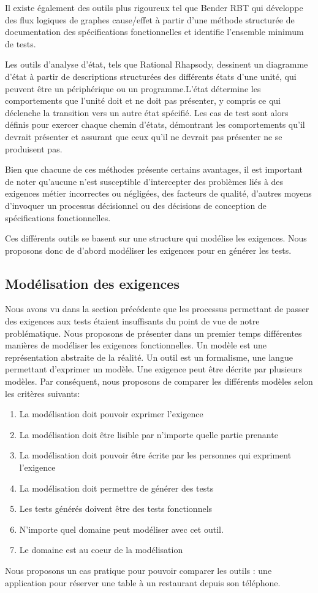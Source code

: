         Il existe également des outils plus rigoureux tel que Bender RBT qui développe des flux logiques de graphes cause/effet à partir d'une méthode structurée de documentation des spécifications fonctionnelles et identifie l'ensemble minimum de tests.
        
        Les outils d'analyse d'état, tels que Rational Rhapsody, dessinent un diagramme d'état à partir de descriptions structurées des différents états d'une unité, qui peuvent être un périphérique ou un programme.L'état détermine les comportements que l'unité doit et ne doit pas présenter, y compris ce qui déclenche la transition vers un autre état spécifié. Les cas de test sont alors définis pour exercer chaque chemin d'états, démontrant les comportements qu'il devrait présenter et assurant que ceux qu'il ne devrait pas présenter ne se produisent pas.
        
        Bien que chacune de ces méthodes présente certains avantages, il est important de noter qu'aucune n'est susceptible d'intercepter des problèmes liés à des exigences métier incorrectes ou négligées, des facteurs de qualité, d'autres moyens d'invoquer un processus décisionnel ou des décisions de conception de spécifications fonctionnelles.
        
        Ces différents outils se basent sur une structure qui modélise les exigences. Nous proposons donc de d'abord modéliser les exigences pour en générer les tests.
        
    \subsection{Modélisation des exigences}
        
    Nous avons vu dans la section précédente que les processus permettant de passer des exigences aux tests étaient insuffisants du point de vue de notre problématique. Nous proposons de présenter dans un premier temps différentes manières de modéliser les exigences fonctionnelles. Un modèle est une représentation abstraite de la réalité. Un outil est un formalisme, une langue permettant d’exprimer un modèle. Une exigence peut être décrite par plusieurs modèles. Par conséquent, nous proposons de comparer les différents modèles selon les critères suivants:
    \begin{enumerate}
        \item La modélisation doit pouvoir exprimer l’exigence
    	\item La modélisation doit être lisible par n’importe quelle partie prenante
    	\item La modélisation doit pouvoir être écrite par les personnes qui expriment l’exigence
    	\item La modélisation doit permettre de générer des tests
    	\item Les tests générés doivent être des tests fonctionnels
    	\item N’importe quel domaine peut modéliser avec cet outil.
    	\item Le domaine est au coeur de la modélisation
    \end{enumerate}
    Nous proposons un cas pratique pour pouvoir comparer les outils : une application pour réserver une table à un restaurant depuis son téléphone.
